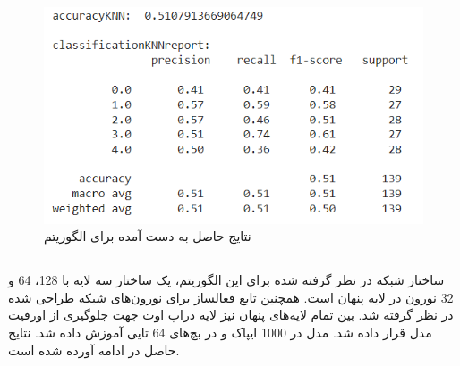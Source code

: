 \newpage

\begin{figure}[h!]
	\centering
	\includegraphics[width=0.9\linewidth]{images/knn_scores.PNG}
	\caption{نتایج حاصل به دست آمده برای الگوریتم }
	\label{fig:knn_scores}
\end{figure}


\subsection{}
ساختار شبکه در نظر گرفته شده برای این الگوریتم، یک ساختار سه لایه با 128، 64 و 32 نورون در لایه پنهان است. همچنین تابع فعالساز 
 برای نورون‌های شبکه طراحی شده در نظر گرفته شد.
بین تمام لایه‌های پنهان نیز لایه دراپ اوت جهت جلوگیری از اورفیت مدل قرار داده شد. مدل در 1000 ایپاک و در بچ‌های 64 تایی آموزش داده شد.
نتایج حاصل در ادامه آورده شده است.

